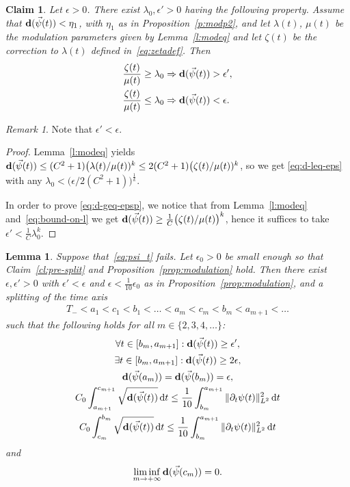 \documentclass[10pt,reqno]{amsart}
\newcommand{\la}{\lambda}
\newcommand{\EQ}[1]{\begin{equation}\begin{split} #1 \end{split}\end{equation}}
\numberwithin{equation}{section}
\newtheorem{lem}[thm]{Lemma}
\newtheorem{claim}[thm]{Claim}
\theoremstyle{remark}
\newtheorem{rem}[thm]{Remark}
\newcommand{\ud}{\mathrm{d}}
\newcommand{\0}{\emptyset}
\newcommand{\eps}{\epsilon}
\newcommand{\bfd}{{\bf d}}
\begin{document}
\begin{claim}\label{cl:split}
Let $\eps > 0$. There exist $\lambda_0, \eps' > 0$ having the following property.
Assume that $\bfd(\vec\psi(t)) < \eta_1$, with $\eta_1$ as in Proposition~\ref{p:modp2}, and let $\lambda(t)$, $\mu(t)$ be the modulation parameters
given by Lemma~\ref{l:modeq} and let $\zeta(t)$ be the correction to $\la(t)$ defined in~\eqref{eq:zetadef}. Then
\begin{align}
\frac{\zeta(t)}{\mu(t)} \geq \lambda_0 &\Rightarrow \bfd(\vec\psi(t)) > \eps', \label{eq:d-geq-epsp} \\
\frac{\zeta(t)}{\mu(t)} \leq \lambda_0 &\Rightarrow \bfd(\vec\psi(t)) < \eps \label{eq:d-leq-eps}.
\end{align}
\end{claim}
\begin{rem}
Note that $\eps' < \eps$.
\end{rem}
\begin{proof}

Lemma~\ref{l:modeq} yields $\bfd(\vec\psi(t)) \leq (C^2+1)\big(\lambda(t)/\mu(t))^k \le 2(C^2+1)\big(\zeta(t)/\mu(t))^k$,
so we get \eqref{eq:d-leq-eps} with any $\lambda_0 < \big(\eps/2(C^2+1)\big)^{\frac 1k}$.

In order to prove \eqref{eq:d-geq-epsp}, we notice that
from Lemma~\ref{l:modeq} and~\eqref{eq:bound-on-l} we get $\bfd(\vec\psi(t)) \geq \frac{1}{C}\big(\zeta(t)/\mu(t)\big)^k$,
hence it suffices to take $\eps' < \frac 1C \lambda_0^k$.
\end{proof}
\begin{lem}
Suppose that~\eqref{eq:psi_t} fails. Let $\eps_0>0$ be small enough so that Claim~\ref{cl:pre-split}
and Proposition~\ref{prop:modulation} hold. Then there exist $\eps, \eps' > 0$ with $\eps' < \eps$  and $\eps< \frac{1}{10} \eps_0$ as in Proposition~\ref{prop:modulation}, 
and a splitting of the time axis
\EQ{
T_- < a_1 < c_1 < b_1 < \dots < a_m < c_m < b_m < a_{m+1} < \dots 
}
such that the following holds for all $m \in \{2, 3, 4, \ldots\}$:
\begin{gather}
\forall t \in [b_{m}, a_{m+1}]: \bfd(\vec\psi(t)) \geq \eps', \label{eq:d-large-all} \\
\exists t \in [b_{m}, a_{m+1}]: \bfd(\vec\psi(t)) \geq 2\eps, \label{eq:d-large-some} \\
\bfd(\vec\psi(a_m)) = \bfd(\vec\psi(b_{m})) = \eps, \label{eq:d-small-some} \\
C_0 \int_{a_{m+1}}^{c_{m+1}}\sqrt{\bfd(\vec\psi(t))}\,\ud t \leq \frac{1}{10}\int_{b_{m}}^{a_{m+1}}\|\partial_t\psi(t)\|_{L^2}^2\,\ud t \label{eq:err-mod-contr-1} \\
C_0 \int_{c_{m}}^{b_{m}}\sqrt{\bfd(\vec\psi(t))}\,\ud t \leq \frac{1}{10}\int_{b_{m}}^{a_{m+1}}\|\partial_t\psi(t)\|_{L^2}^2\,\ud t \label{eq:err-mod-contr-2}
\end{gather}
and
\EQ{
\liminf_{m \to+\infty} \bfd(\vec\psi(c_m)) = 0. \label{eq:d-conv-0}
}
\end{lem}
\end{document}
